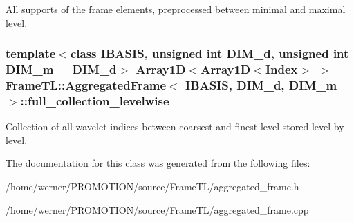 All supports of the frame elements, preprocessed between minimal and maximal level. \hypertarget{classFrameTL_1_1AggregatedFrame_71d04f538cfd359189ed4898712c54b0}{
\subsubsection[full\_\-collection\_\-levelwise]{\setlength{\rightskip}{0pt plus 5cm}template$<$class IBASIS, unsigned int DIM\_\-d, unsigned int DIM\_\-m = DIM\_\-d$>$ Array1D$<$Array1D$<${\bf Index}$>$ $>$ {\bf FrameTL::AggregatedFrame}$<$ IBASIS, DIM\_\-d, DIM\_\-m $>$::{\bf full\_\-collection\_\-levelwise}}}
\label{classFrameTL_1_1AggregatedFrame_71d04f538cfd359189ed4898712c54b0}


Collection of all wavelet indices between coarsest and finest level stored level by level. 

The documentation for this class was generated from the following files:\begin{CompactItemize}
\item 
/home/werner/PROMOTION/source/FrameTL/aggregated\_\-frame.h\item 
/home/werner/PROMOTION/source/FrameTL/aggregated\_\-frame.cpp\end{CompactItemize}
